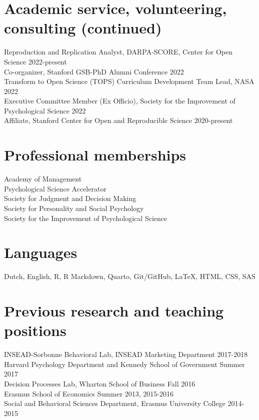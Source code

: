 \documentclass[11pt,a4paper,]{awesome-cv}
\begin{document}
\hypertarget{academic-service-volunteering-consulting-continued}{%
\section{Academic service, volunteering, consulting
(continued)}\label{academic-service-volunteering-consulting-continued}}

Reproduction and Replication Analyst, DARPA-SCORE, Center for Open
Science \hfill 2022-present\\
Co-organizer, Stanford GSB-PhD Alumni Conference \hfill 2022\\
Transform to Open Science (TOPS) Curriculum Development Team Lead, NASA
\hfill 2022\\
Executive Committee Member (Ex Officio), Society for the Improvement of
Psychological Science \hfill 2022\\
Affiliate, Stanford Center for Open and Reproducible Science
\hfill 2020-present

\hypertarget{professional-memberships}{%
\section{Professional memberships}\label{professional-memberships}}

Academy of Management\\
Psychological Science Accelerator\\
Society for Judgment and Decision Making\\
Society for Personality and Social Psychology\\
Society for the Improvement of Psychological Science

\hypertarget{languages}{%
\section{Languages}\label{languages}}

Dutch, English, R, R Markdown, Quarto, Git/GitHub, \LaTeX, HTML, CSS,
SAS

\hypertarget{previous-research-and-teaching-positions}{%
\section{Previous research and teaching
positions}\label{previous-research-and-teaching-positions}}

INSEAD-Sorbonne Behavioral Lab, INSEAD Marketing Department
\hfill 2017-2018\\
Harvard Psychology Department and Kennedy School of Government
\hfill Summer 2017\\
Decision Processes Lab, Wharton School of Business \hfill Fall 2016\\
Erasmus School of Economics \hfill Summer 2013, 2015-2016\\
Social and Behavioral Sciences Department, Erasmus University College
\hfill 2014-2015


\label{LastPage}~
\end{document}

